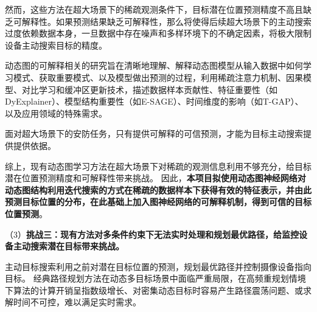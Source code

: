 然而，这些方法在超大场景下的稀疏观测条件下，目标潜在位置预测精度不高且缺乏可解释性。如果预测结果缺乏可解释性，那么将使得后续超大场景下的主动搜索过度依赖数据本身，一旦数据中存在噪声和多样环境下的不确定因素，将极大限制设备主动搜索目标的精度。

动态图的可解释相关的研究旨在清晰地理解、解释动态图模型从输入数据中如何学习模式、获取重要模式、以及模型做出预测的过程，利用稀疏注意力机制、因果模型\cite{zhao2024causality}、对比学习\cite{wang2024dyexplainer}和缓冲区更新技术，描述数据样本贡献性\cite{DBLP:conf/iclr/ChenLLH23}、特征重要性（如DyExplainer\cite{wang2024dyexplainer}）、模型结构重要性（如E-SAGE\cite{wang2024esage}）、时间维度的影响（如T-GAP\cite{jung2021learning}）、以及应用领域的特殊需求。

面对超大场景下的安防任务，只有提供可解释的可信预测，才能为目标主动搜索提供提供依据。

综上，现有动态图学习方法在超大场景下对稀疏的观测信息利用不够充分，给目标潜在位置预测精度和可解释性带来挑战。
因此，\textbf{本项目拟使用动态图神经网络对动态图结构利用迭代搜索的方式在稀疏的数据样本下获得有效的特征表示，并由此预测目标位置的分布，在此基础上加入图神经网络的可解释机制，得到可信的目标位置预测}。


（3）\textbf{挑战三：现有方法对多条件约束下无法实时处理和规划最优路径，给监控设备主动搜索潜在目标带来挑战。}

主动目标搜索利用之前对潜在目标位置的预测，规划最优路径并控制摄像设备指向目标。
经典路径规划方法在动态多目标场景中面临严重局限，在高频重规划情境下算法的计算开销呈指数级增长\cite{bhardwaj2017learningheuristicsearchimitation}、对密集动态目标时容易产生路径震荡问题\cite{9154607}、或求解时间不可控\cite{10.1145/3272127.3275109}，难以满足实时需求。

